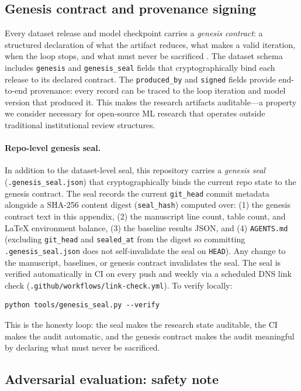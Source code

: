 \subsection{Genesis contract and provenance signing}
\label{sec:disclaimer:genesis}

Every dataset release and model checkpoint carries a \emph{genesis
contract}: a structured declaration of what the artifact reduces, what makes
a valid iteration, when the loop stops, and what must never be sacrificed
\citep{vaked2024genesis}. The dataset schema includes \texttt{genesis} and
\texttt{genesis\_seal} fields that cryptographically bind each release to
its declared contract. The \texttt{produced\_by} and \texttt{signed} fields
provide end-to-end provenance: every record can be traced to the loop
iteration and model version that produced it. This makes the research
artifacts auditable---a property we consider necessary for open-source ML
research that operates outside traditional institutional review structures.

\paragraph{Repo-level genesis seal.} In addition to the dataset-level seal,
this repository carries a \emph{genesis seal} (\texttt{.genesis\_seal.json})
that cryptographically binds the current repo state to the genesis contract.
The seal records the current \texttt{git\_head} commit metadata alongside a
SHA-256 content digest (\texttt{seal\_hash}) computed over: (1) the genesis
contract text in this appendix, (2) the manuscript line count, table count,
and LaTeX environment balance, (3) the baseline results JSON, and (4)
\texttt{AGENTS.md} (excluding \texttt{git\_head} and \texttt{sealed\_at} from
the digest so committing \texttt{.genesis\_seal.json} does not self-invalidate
the seal on \texttt{HEAD}). Any change to the manuscript,
baselines, or genesis contract invalidates the seal. The seal is verified
automatically in CI on every push and weekly via a scheduled DNS link check
(\texttt{.github/workflows/link-check.yml}). To verify locally:
\begin{verbatim}
python tools/genesis_seal.py --verify
\end{verbatim}
This is the honesty loop: the seal makes the research state auditable, the
CI makes the audit automatic, and the genesis contract makes the audit
meaningful by declaring what must never be sacrificed.

\subsection{Adversarial evaluation: safety note}
\label{sec:disclaimer:heretic}


